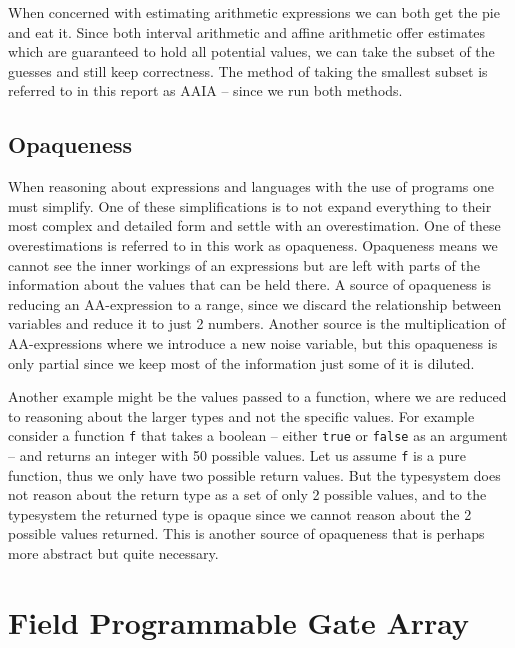 When concerned with estimating arithmetic expressions we can both get the pie and eat it. Since both interval arithmetic and affine arithmetic offer estimates which are guaranteed to hold all potential values, we can take the subset of the guesses and still keep correctness. The method of taking the smallest subset is referred to in this report as AAIA -- since we run both methods.

\subsection{Opaqueness}
When reasoning about expressions and languages with the use of programs one must simplify. One of these simplifications is to not expand everything to their most complex and detailed form and settle with an overestimation. One of these overestimations is referred to in this work as opaqueness. Opaqueness means we cannot see the inner workings of an expressions but are left with parts of the information about the values that can be held there. A source of opaqueness is reducing an AA-expression to a range, since we discard the relationship between variables and reduce it to just 2 numbers. Another source is the multiplication of AA-expressions where we introduce a new noise variable, but this opaqueness is only partial since we keep most of the information just some of it is diluted.

Another example might be the values passed to a function, where we are reduced to reasoning about the larger types and not the specific values. For example consider a function \verb+f+ that takes a boolean -- either \verb+true+ or \verb+false+ as an argument -- and returns an integer with 50 possible values. Let us assume \verb+f+ is a pure function, thus we only have two possible return values. But the typesystem does not reason about the return type as a set of only 2 possible values, and to the typesystem the returned type is opaque since we cannot reason about the 2 possible values returned. This is another source of opaqueness that is perhaps more abstract but quite necessary.


\section{Field Programmable Gate Array}


